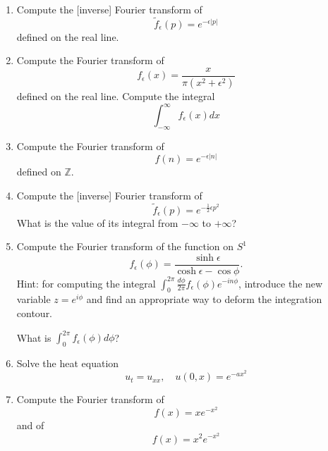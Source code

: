 \documentclass[a4paper,11pt]{article}
\begin{document}
\begin{enumerate}
\item\label{item:9} Compute the [inverse] Fourier transform of
\[
\tilde{f}_{\epsilon}(p)=e^{-\epsilon|p|}
\]
defined on the real line.

\item\label{item:10} Compute the Fourier transform of
\[
f_{\epsilon}(x)=\frac{x}{\pi(x^2+\epsilon^2)}
\]
defined on the real line.
Compute the integral
\[
\int_{-\infty}^{\infty}f_{\epsilon}(x)dx
\]

\item\label{item:11} Compute the Fourier transform of
\[
f(n)=e^{-\epsilon|n|}
\]
defined on \(\mathbb{Z}\).

\item\label{item:12} Compute the [inverse] Fourier transform of
\[
\tilde{f}_\epsilon(p)=e^{-\frac12\epsilon p^2}
\]
What is the value of its integral from \(-\infty\) to \(+\infty\)?

\item\label{item:13} Compute the Fourier transform of the function on \(S^1\)
\[
f_{\epsilon}(\phi) = \frac{\sinh \epsilon}{\cosh \epsilon-\cos \phi}.
\]
Hint: for computing the integral \(\int_0^{2\pi} \frac{d\phi}{2\pi} f_{\epsilon}(\phi)e^{-i n \phi}\), introduce the new variable \(z=e^{i \phi}\) and find an appropriate way to deform the integration contour.

What is \(\int_0^{2\pi} f_{\epsilon}(\phi)d\phi\)?

\item\label{item:14} Solve the heat equation
\[
u_t=u_{xx}, \quad u(0,x)=e^{-a x^2}
\]

\item\label{item:15} Compute the Fourier transform of
\[
f(x)=x e^{-x^2}
\]
and of
\[
f(x)=x^2 e^{-x^2}
\]
\end{enumerate}
\end{document}
